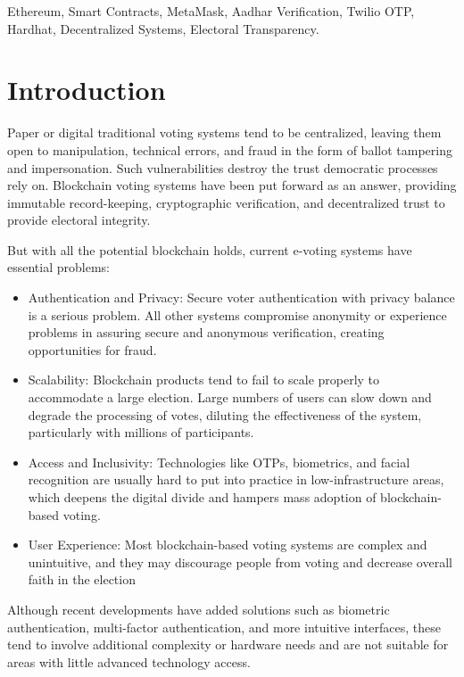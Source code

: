 \documentclass[conference]{IEEEtran}
\begin{document}
\begin{IEEEkeywords}
Ethereum, Smart Contracts, MetaMask, Aadhar Verification, Twilio OTP, Hardhat, Decentralized Systems, Electoral Transparency.
\end{IEEEkeywords}
\section{Introduction}
Paper or digital traditional voting systems tend to be centralized, leaving them open to manipulation, technical errors, and fraud in the form of ballot tampering and impersonation. Such vulnerabilities destroy the trust democratic processes rely on. Blockchain voting systems have been put forward as an answer, providing immutable record-keeping, cryptographic verification, and decentralized trust to provide electoral integrity.

But with all the potential blockchain holds, current e-voting systems have essential problems:

\begin{itemize}
    \item Authentication and Privacy: Secure voter authentication with privacy balance is a serious problem. All other systems compromise anonymity or experience problems in assuring secure and anonymous verification, creating opportunities for fraud.
    
    \item Scalability: Blockchain products tend to fail to scale properly to accommodate a large election. Large numbers of users can slow down and degrade the processing of votes, diluting the effectiveness of the system, particularly with millions of participants.
    
    \item Access and Inclusivity: Technologies like OTPs, biometrics, and facial recognition are usually hard to put into practice in low-infrastructure areas, which deepens the digital divide and hampers mass adoption of blockchain-based voting.
    
    \item User Experience: Most blockchain-based voting systems are complex and unintuitive, and they may discourage people from voting and decrease overall faith in the election
\end{itemize}
Although recent developments have added solutions such as biometric authentication, multi-factor authentication, and more intuitive interfaces, these tend to involve additional complexity or hardware needs and are not suitable for areas with little advanced technology access.
\end{document}

